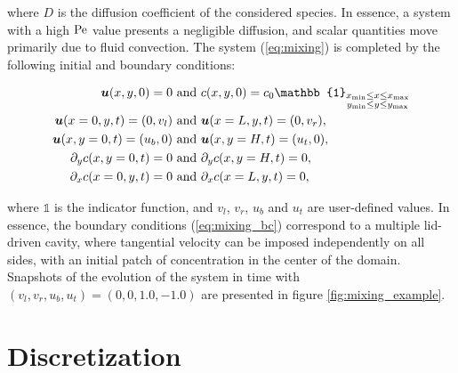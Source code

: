 where $D$ is the diffusion coefficient of the considered species. In essence, a system with a high $\text{Pe}$ value presents a negligible diffusion, and scalar quantities move primarily due to fluid convection. The system (\ref{eq:mixing}) is completed by the following initial and boundary conditions:

\begin{equation}
\label{eq:mixing_bc}
\begin{split}
	\V{u}(x,y,0)	= 0 &\text{ and } c(x,y,0)	= c_0 \mathbb{1}_{\substack{ {x_\text{min} \leq x \leq x_\text{max}}\\ {y_\text{min} \leq y \leq y_\text{max}} }} \\
	\V{u}(x=0,y,t)	= (0, v_l) &\text{ and } \V{u}(x=L,y,t) = (0, v_r), \\
	\V{u}(x,y=0,t)	= (u_b, 0) &\text{ and } \V{u}(x,y=H,t) = (u_t, 0), \\
	\partial_y c(x,y=0,t) 	= 0 &\text{ and } \partial_y c(x,y=H,t) = 0, \\
	\partial_x c(x=0,y,t) = 0 &\text{ and } \partial_x c(x=L,y,t) = 0,
\end{split}
\end{equation}

where $\mathbb{1}$ is the indicator function, and $v_l$, $v_r$, $u_b$ and $u_t$ are user-defined values. In essence, the boundary conditions (\ref{eq:mixing_bc}) correspond to a multiple lid-driven cavity, where tangential velocity can be imposed independently on all sides, with an initial patch of concentration in the center of the domain.  Snapshots of the evolution of the system in time with $(v_l, v_r, u_b, u_t) = (0, 0, 1.0, -1.0)$ are presented in figure \ref{fig:mixing_example}.



\section{Discretization}
%

